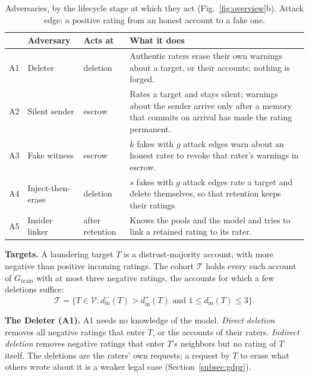 \documentclass[lettersize,journal]{IEEEtran}
\begin{document}
\begin{table}[!t]
\caption{Adversaries, by the lifecycle stage at which they act (Fig.~\ref{fig:overview}b). Attack edge: a positive rating from an honest account to a fake one.}
\label{tab:adversaries}
\centering
\footnotesize
\setlength{\tabcolsep}{3pt}
\begin{tabular}{@{}l>{\raggedright\arraybackslash}p{}>{\raggedright\arraybackslash}p{}>{\raggedright\arraybackslash}p{}@{}}
\toprule
 & \textbf{Adversary} & \textbf{Acts at} & \textbf{What it does} \\
\midrule
A1 & Deleter & deletion & Authentic raters erase their own warnings about a target, or their accounts; nothing is forged. \\
A2 & Silent sender & escrow & Rates a target and stays silent; warnings about the sender arrive only after a memory that commits on arrival has made the rating permanent. \\
A3 & Fake witness & escrow & $k$ fakes with $g$ attack edges warn about an honest rater to revoke that rater's warnings in escrow. \\
A4 & Inject-then-erase & deletion & $s$ fakes with $g$ attack edges rate a target and delete themselves, so that retention keeps their ratings. \\
A5 & Insider linker & after retention & Knows the pools and the model and tries to link a retained rating to its rater. \\
\bottomrule
\end{tabular}
\end{table}

\smallskip\noindent\textbf{Targets.}
A laundering target $T$ is a distrust-majority account, with more negative than positive incoming ratings.
The cohort $\mathcal{T}$ holds every such account of $G_{\mathrm{train}}$ with at most three negative ratings, the accounts for which a few deletions suffice:
\begin{equation}
\label{eq:cohort}
\mathcal{T} = \{T \in \mathcal{V} : d^-_{\mathrm{in}}(T) > d^+_{\mathrm{in}}(T) \text{ and } 1 \le d^-_{\mathrm{in}}(T) \le 3\}.
\end{equation}

\smallskip\noindent\textbf{The Deleter (A1).}
A1 needs no knowledge of the model.
\emph{Direct deletion} removes all negative ratings that enter $T$, or the accounts of their raters. \emph{Indirect deletion} removes negative ratings that enter $T$'s neighbors but no rating of $T$ itself.
The deletions are the raters' own requests; a request by $T$ to erase what others wrote about it is a weaker legal case (Section~\ref{subsec:gdpr}).
\end{document}
